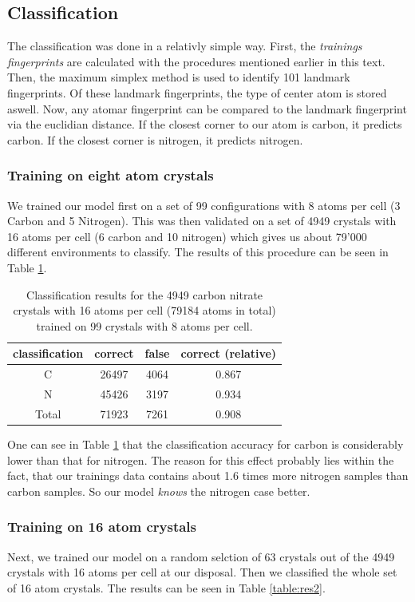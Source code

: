 \newpage
\subsection{Classification}
The classification was done in a relativly simple way. First, the \emph{trainings fingerprints} are calculated with the procedures mentioned earlier in this text. Then, the maximum simplex method is used to identify 101 landmark fingerprints. Of these landmark fingerprints, the type of center atom is stored aswell. Now, any atomar fingerprint can be compared to the landmark fingerprint via the euclidian distance. If the closest corner to our atom is carbon, it predicts carbon. If the closest corner is nitrogen, it predicts nitrogen.\\
\subsubsection{Training on eight atom crystals}
We trained our model first on a set of 99 configurations with 8 atoms per cell (3 Carbon and 5 Nitrogen). This was then validated on a set of 4949 crystals with 16 atoms per cell (6 carbon and 10 nitrogen) which gives us about 79'000 different environments to classify. The results of this procedure can be seen in Table \ref{table:res1}. 

\begin{table}[h!]
\center
\begin{tabular}{c|c|c|c}
classification & correct & false & correct (relative) \\ \hline
C              & 26497   & 4064  & 0.867              \\ \hline
N              & 45426   & 3197  & 0.934              \\ \hline
Total          & 71923   & 7261  & 0.908             
\end{tabular}
\caption{Classification results for the 4949 carbon nitrate crystals with 16 atoms per cell (79184 atoms in total) trained on 99 crystals with 8 atoms per cell.}
\label{table:res1}
\end{table}

One can see in Table \ref{table:res1} that the classification accuracy for carbon is considerably lower than that for nitrogen. The reason for this effect probably lies within the fact, that our trainings data contains about 1.6 times more nitrogen samples than carbon samples. So our model \emph{knows} the nitrogen case better.

\subsubsection{Training on 16 atom crystals}
Next, we trained our model on a random selction of 63 crystals out of the 4949 crystals with 16 atoms per cell at our disposal. Then we classified the whole set of 16 atom crystals. The results can be seen in Table \ref{table:res2}.

